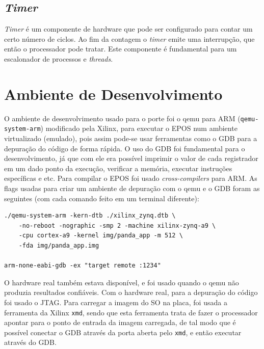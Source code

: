 \subsection{\emph{Timer}}

\emph{Timer} é um componente de hardware que pode ser configurado para contar um certo número de ciclos. Ao fim da contagem o \emph{timer} emite uma interrupção, que então o processador pode tratar. Este componente é fundamental para um escalonador de processos e \emph{threads}.



\section{Ambiente de Desenvolvimento}

O ambiente de desenvolvimento usado para o porte foi o qemu para ARM (\verb+qemu-system-arm+) modificado pela Xilinx, para executar o EPOS num ambiente virtualizado (emulado), pois assim pode-se usar ferramentas como o GDB para a depuração do código de forma rápida. O uso do GDB foi fundamental para o desenvolvimento, já que com ele era possível imprimir o valor de cada registrador em um dado ponto da execução, verificar a memória, executar instruções específicas e etc. Para compilar o EPOS foi usado \emph{cross-compilers} para ARM. As flags usadas para criar um ambiente de depuração com o qemu e o GDB foram as seguintes (com cada comando feito em um terminal diferente):
\begin{verbatim}
./qemu-system-arm -kern-dtb ./xilinx_zynq.dtb \
    -no-reboot -nographic -smp 2 -machine xilinx-zynq-a9 \
    -cpu cortex-a9 -kernel img/panda_app -m 512 \
    -fda img/panda_app.img

arm-none-eabi-gdb -ex "target remote :1234"
\end{verbatim}

O hardware real também estava disponível, e foi usado quando o qemu não produzia resultados confiáveis. Com o hardware real, para a depuração do código foi usado o JTAG.
Para carregar a imagem do SO na placa, foi usada a ferramenta da Xilinx \verb-xmd-, sendo que esta ferramenta trata de fazer o processador apontar para o ponto de entrada da imagem carregada, de tal modo que é possível conectar o GDB através da porta aberta pelo \verb+xmd+, e então executar através do GDB.
